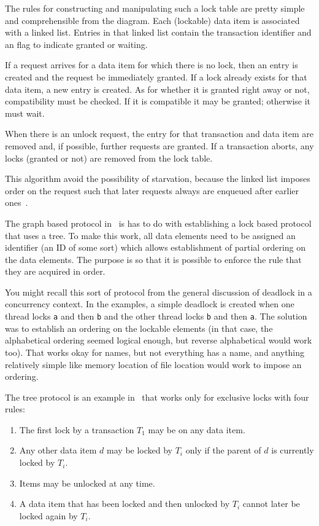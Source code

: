 The rules for constructing and manipulating such a lock table are pretty simple and comprehensible from the diagram. Each (lockable) data item is associated with a linked list. Entries in that linked list contain the transaction identifier and an flag to indicate granted or waiting.

If a request arrives for a data item for which there is no lock, then an entry is created and the request be immediately granted. If a lock already exists for that data item, a new entry is created. As for whether it is granted right away or not, compatibility must be checked. If it is compatible it may be granted; otherwise it must wait. 

When there is an unlock request, the entry for that transaction and data item are removed and, if possible, further requests are granted. If a transaction aborts, any locks (granted or not) are removed from the lock table.

This algorithm avoid the possibility of starvation, because the linked list imposes order on the request such that later requests always are enqueued after earlier ones~\cite{dsc}.

The graph based protocol in~\cite{dsc} is has to do with establishing a lock based protocol that uses a tree. To make this work, all data elements need to be assigned an identifier (an ID of some sort) which allows establishment of partial ordering on the data elements. The purpose is so that it is possible to enforce the rule that they are acquired in order.

You might recall this sort of protocol from the general discussion of deadlock in a concurrency context. In the examples, a simple deadlock is created when one thread locks \texttt{a} and then \texttt{b} and the other thread locks \texttt{b} and then \texttt{a}. The solution was to establish an ordering on the lockable elements (in that case, the alphabetical ordering seemed logical enough, but reverse alphabetical would work too). That works okay for names, but not everything has a name, and anything relatively simple like memory location of file location would work to impose an ordering.

The tree protocol is an example in~\cite{dsc} that works only for exclusive locks with four rules:

\begin{enumerate}
	\item The first lock by a transaction $T_{1}$ may be on any data item.
	\item Any other data item $d$ may be locked by $T_{i}$ only if the parent of $d$ is currently locked by $T_{i}$.
	\item Items may be unlocked at any time.
	\item A data item that has been locked and then unlocked by $T_{i}$ cannot later be locked again by $T_{i}$.
\end{enumerate}

